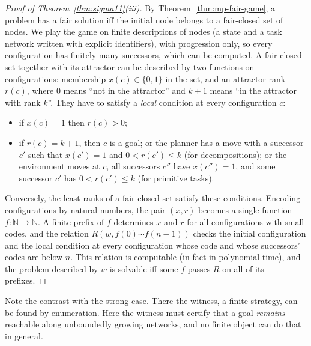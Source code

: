 \begin{proof}[Proof of Theorem~\ref{thm:sigma11}(iii)]
  By Theorem~\ref{thm:mp-fair-game}, a problem has a fair solution iff the initial node belongs to
  a fair-closed set of nodes. We play the game on finite descriptions of nodes (a state and a
  task network written with explicit identifiers), with progression only, so every configuration
  has finitely many successors, which can be computed. A fair-closed set together with its attractor
  can be described by two functions on configurations: membership $x(c)\in\{0,1\}$ in the set, and
  an attractor rank $r(c)$, where $0$ means ``not in the attractor'' and $k+1$ means ``in the
  attractor with rank $k$''. They have to satisfy a \emph{local} condition at every configuration
  $c$:
  \begin{itemize}
    \item if $x(c)=1$ then $r(c)>0$;
    \item if $r(c)=k+1$, then $c$ is a goal; or the planner has a move with a successor $c'$ such that
      $x(c')=1$ and $0<r(c')\le k$ (for decompositions); or the environment moves at $c$, all
      successors $c''$ have $x(c'')=1$, and some successor $c'$ has $0<r(c')\le k$ (for primitive
      tasks).
  \end{itemize}
  Conversely, the least ranks of a fair-closed set satisfy these conditions. Encoding
  configurations by natural numbers, the pair $(x,r)$ becomes a single function
  $f:\mathbb N\to\mathbb N$. A finite prefix of $f$ determines $x$ and $r$ for all configurations
  with small codes, and the relation $R(w,f(0)\cdots f(n-1))$ checks the initial configuration and
  the local condition at every configuration whose code and whose successors' codes are below $n$.
  This relation is computable (in fact in polynomial time), and the problem described by $w$ is
  solvable iff some $f$ passes $R$ on all of its prefixes.
\end{proof}

Note the contrast with the strong case. There the witness, a finite strategy, can be found by
enumeration. Here the witness must certify that a goal \emph{remains} reachable along unboundedly
growing networks, and no finite object can do that in general.

